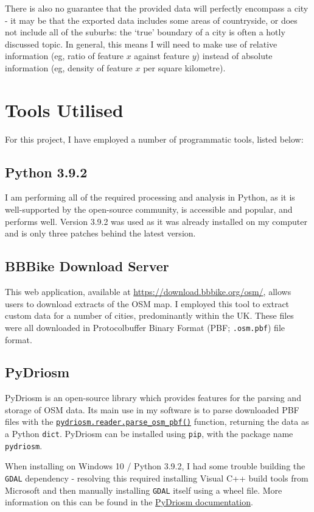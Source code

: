\documentclass[12pt]{article} %
\begin{document}
There is also no guarantee that the provided data will perfectly encompass a city - it may be that the exported data includes some areas of countryside, or does not include all of the suburbs: the `true' boundary of a city is often a hotly discussed topic. In general, this means I will need to make use of relative information (eg, ratio of feature $x$ against feature $y$) instead of absolute information (eg, density of feature $x$ per square kilometre).


\section{Tools Utilised}
For this project, I have employed a number of programmatic tools, listed below:

\subsection{Python 3.9.2}
I am performing all of the required processing and analysis in Python, as it is well-supported by the open-source community, is accessible and popular, and performs well. Version 3.9.2 was used as it was already installed on my computer and is only three patches behind the latest version.

\subsection{BBBike Download Server}
This web application, available at \href{https://download.bbbike.org/osm/}{https://download.bbbike.org/osm/}, allows users to download extracts of the OSM map. I employed this tool to extract custom data for a number of cities, predominantly within the UK. These files were all downloaded in Protocolbuffer Binary Format (PBF; \texttt{.osm.pbf}) file format.

\subsection{PyDriosm}
PyDriosm is an open-source library which provides features for the parsing and storage of OSM data. Its main use in my software is to parse downloaded PBF files with the \href{https://pydriosm.readthedocs.io/en/latest/_generated/pydriosm.reader.parse_osm_pbf.html}{\texttt{pydriosm.reader.parse\_osm\_pbf()}} function, returning the data as a Python \texttt{dict}. PyDriosm can be installed using \texttt{pip}, with the package name \texttt{pydriosm}.

When installing on Windows 10 / Python 3.9.2, I had some trouble building the \texttt{GDAL} dependency - resolving this required installing Visual C++ build tools from Microsoft and then manually installing \texttt{GDAL} itself using a wheel file. More information on this can be found in the \href{https://pydriosm.readthedocs.io/en/latest/installation.html}{PyDriosm documentation}.
\end{document}

